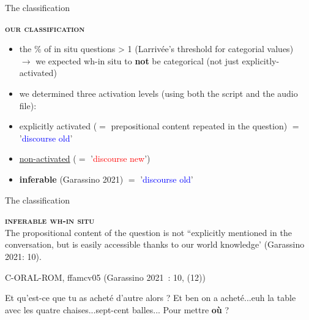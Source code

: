 \documentclass[lesson_slides]{subfiles}
\begin{document}
\begin{frame}{The classification}

    \textbf{\textsc{our classification}}
    \begin{itemize}
        \item[\ding{227}] the \% of in situ questions > 1 (Larrivée's threshold for categorial values)\\ $\longrightarrow$ we expected wh-in situ to \textbf{not} be categorical (not just explicitly-activated)
        \item[\ding{227}] we determined three activation levels (using both the script and the audio file):
        \item[\ding{227}] explicitly activated ($=$ prepositional content repeated in the question) $=$ '\textcolor{blue}{discourse old}'
        \item[\ding{227}] \underline{non-activated} ($=$ '\textcolor{red}{discourse new}')
        \item[\ding{227}] \textbf{inferable} (Garassino 2021) $=$ '\textcolor{blue}{discourse old}'
            
    \end{itemize}

\end{frame}
\begin{frame}{The classification}

    \textbf{\textsc{inferable wh-in situ}}\\ \pause
    The propositional content of the question is not “explicitly mentioned in the conversation, but is easily accessible thanks to our world knowledge’ (Garassino 2021: 10). \pause 

    \begin{exe}
        \ex C-ORAL-ROM, ffamcv05 (Garassino 2021 : 10, (12))
 \pause
        \begin{xlist}
             Et qu’est-ce que tu as acheté d’autre alors ? \pause
             Et ben on a acheté...euh la table avec les quatre chaises...sept-cent balles... \pause
             Pour mettre \textbf{où} ?
        \end{xlist} 
    \end{exe}

\end{frame}
\end{document}
